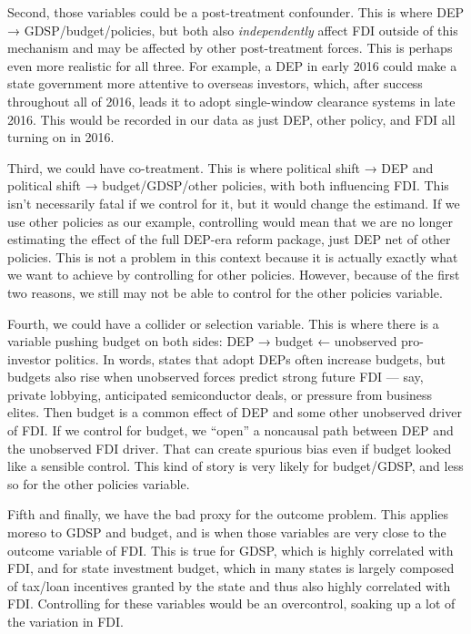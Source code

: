 \documentclass[12pt]{article}
\begin{document}
Second, those variables could be a post-treatment confounder. This is where DEP → GDSP/budget/policies, but both also \textit{independently} affect FDI outside of this mechanism and may be affected by other post-treatment forces. This is perhaps even more realistic for all three. For example, a DEP in early 2016 could make a state government more attentive to overseas investors, which, after success throughout all of 2016, leads it to adopt single-window clearance systems in late 2016. This would be recorded in our data as just DEP, other policy, and FDI all turning on in 2016.

Third, we could have co-treatment. This is where political shift → DEP and political shift → budget/GDSP/other policies, with both influencing FDI. This isn't necessarily fatal if we control for it, but it would change the estimand. If we use other policies as our example, controlling would mean that we are no longer estimating the effect of the full DEP-era reform package, just DEP net of other policies. This is not a problem in this context because it is actually exactly what we want to achieve by controlling for other policies. However, because of the first two reasons, we still may not be able to control for the other policies variable.

Fourth, we could have a collider or selection variable. This is where there is a variable pushing budget on both sides: DEP → budget ← unobserved pro-investor politics. In words, states that adopt DEPs often increase budgets, but budgets also rise when unobserved forces predict strong future FDI — say, private lobbying, anticipated semiconductor deals, or pressure from business elites. Then budget is a common effect of DEP and some other unobserved driver of FDI. If we control for budget, we “open” a noncausal path between DEP and the unobserved FDI driver. That can create spurious bias even if budget looked like a sensible control. This kind of story is very likely for budget/GDSP, and less so for the other policies variable.

Fifth and finally, we have the bad proxy for the outcome problem. This applies moreso to GDSP and budget, and is when those variables are very close to the outcome variable of FDI. This is true for GDSP, which is highly correlated with FDI, and for state investment budget, which in many states is largely composed of tax/loan incentives granted by the state and thus also highly correlated with FDI. Controlling for these variables would be an overcontrol, soaking up a lot of the variation in FDI.
\end{document}
